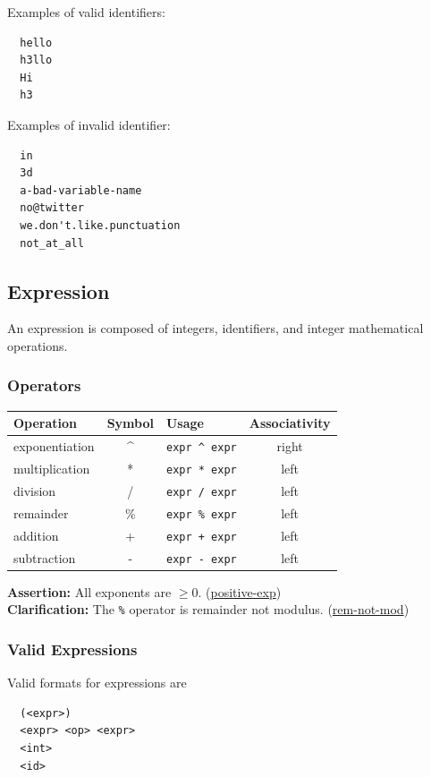 \documentclass{article}
\newcommand{\code}[1]{\texttt{\textmd{#1}}}
\newcommand{\assertion}[2]{\textbf{Assertion: }#1 (\hyperlink{#2}{#2})}
\newcommand{\clarification}[2]{\textbf{Clarification: }#1 (\hyperlink{#2}{#2})}
\begin{document}
Examples of valid identifiers:
\begin{lstlisting}
  hello
  h3llo
  Hi
  h3
\end{lstlisting}

Examples of invalid identifier:
\begin{lstlisting}
  in
  3d
  a-bad-variable-name
  no@twitter
  we.don't.like.punctuation
  not_at_all
\end{lstlisting}

\subsection{Expression}
An expression is composed of integers, identifiers, and integer mathematical operations.

\subsubsection{Operators}
\begin{center}
  \begin{tabular}{|l|c|l|c|}
    \hline
    \textbf{Operation} & \textbf{Symbol} & \textbf{Usage} &
    \textbf{Associativity} \\
    \hline
    exponentiation & \textasciicircum & \code{expr \textasciicircum\ expr} & right\\
    multiplication & *  & \code{expr * expr}  & left \\
    division       & /  & \code{expr / expr}  & left \\
    remainder      & \% & \code{expr \% expr}  & left \\
    addition       & +  & \code{expr + expr}  & left \\
    subtraction    & -  & \code{expr - expr}  & left \\
    \hline
  \end{tabular}
\end{center}

\assertion{All exponents are $\geq 0$.}{positive-exp}\\
\clarification{The \code{\%} operator is remainder not modulus.}{rem-not-mod}

\subsubsection{Valid Expressions}
Valid formats for expressions are
\begin{lstlisting}
  (<expr>)
  <expr> <op> <expr>
  <int>
  <id>
\end{lstlisting}
\end{document}
